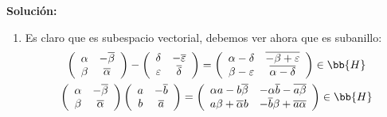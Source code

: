 \begin{ejercicio}
    \noindent
    \textbf{Solución:}
    \begin{enumerate}
        \item Es claro que es subespacio vectorial, debemos ver ahora que es subanillo:
            \begin{gather*}
                \left(\begin{array}{cc}
                    \alpha  & -\overline{\beta } \\
                    \beta  & \overline{\alpha } 
                \end{array}\right) 
                - \left(\begin{array}{cc}
                    \delta  & -\overline{\varepsilon} \\
                    \varepsilon & \overline{\delta}  
                \end{array}\right) 
                = \left(\begin{array}{cc}
                    \alpha - \delta  & \overline{-\beta+\varepsilon} \\
                    \beta-\varepsilon & \overline{\alpha-\delta} 
            \end{array}\right) \in \bb{H} \\
            \left(\begin{array}{cc}
                \alpha  & -\overline{\beta}  \\
                \beta  & \overline{\alpha} 
            \end{array}\right) 
            \left(\begin{array}{cc}
                a & -\overline{b} \\
                b & \overline{a}  
            \end{array}\right)
            = \left(\begin{array}{cc}
                \alpha a-b\overline{\beta } & -\alpha\overline{b} -\overline{a\beta} \\
                a\beta + \overline{\alpha }b & -\overline{b}\beta + \overline{a\alpha} 
        \end{array}\right) \in \bb{H}
            \end{gather*}


\end{enumerate}
\end{ejercicio}
